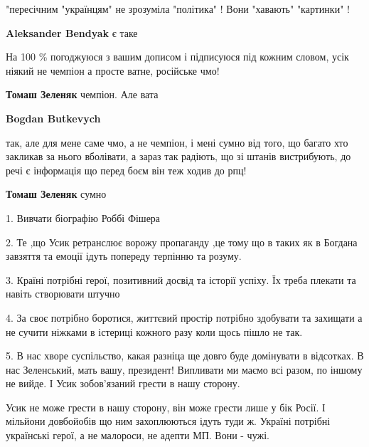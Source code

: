 \begin{itemize}
"пересічним "українцям" не зрозуміла "політика" ! Вони "хавають" "картинки" !

\begin{itemize} %
\textbf{Aleksander Bendyak} є таке
\end{itemize} %

На 100 \% погоджуюся з вашим дописом і підписуюся під кожним словом, усік ніякий
не чемпіон а просте ватне, російське чмо!

\begin{itemize} %
\textbf{Томаш Зеленяк} чемпіон. Але вата

\textbf{Bogdan Butkevych} 

так, але для мене саме чмо, а не чемпіон, і мені сумно від того, що багато хто
закликав за нього вболівати, а зараз так радіють, що зі штанів вистрибують, до
речі є інформація що перед боєм він теж ходив до рпц!

\textbf{Томаш Зеленяк} сумно
\end{itemize} %


1. Вивчати біографію Роббі Фішера

2. Те ,що Усик ретранслює ворожу пропаганду ,це тому що в таких як в Богдана завзяття та емоції ідуть попереду терпінню та розуму.

3. Країні потрібні герої, позитивний досвід та історії успіху. Їх треба плекати та навіть створювати штучно

4. За своє потрібно боротися, життєвий простір потрібно здобувати та захищати а
не сучити ніжками в істериці кожного разу коли щось пішло не так.

5. В нас хворе суспільство, какая разніца ще довго буде домінувати в відсотках. В
нас Зеленський, мать вашу, президент! Випливати ми маємо всі разом, по іншому не
вийде. І Усик зобов'язаний грести в нашу сторону.

\begin{itemize} %

Усик не може грести в нашу сторону, він може грести лише у бік Росії. І
мільйони довбойобів що ним захоплюються ідуть туди ж. Україні потрібні
українські герої, а не малороси, не адепти МП. Вони - чужі.

\end{itemize} %



\end{itemize}
